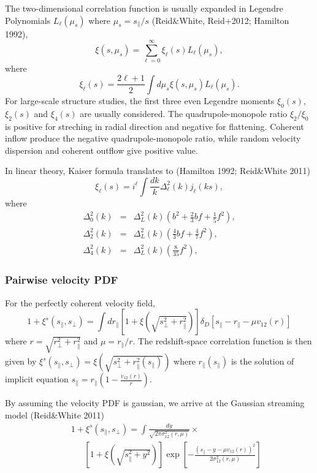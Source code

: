 \documentclass[useAMS,usenatbib,twocolumn]{mn2e}
\begin{document}
The two-dimensional correlation function is usually expanded in Legendre
Polynomials $L_\ell(\mu_s)$ where $\mu_s=s_\parallel/s$ (Reid\&White, Reid+2012;
Hamilton 1992),
\begin{equation}
\xi(s,\mu_s)=\sum_{\ell=0}^\infty\xi_\ell(s)L_\ell(\mu_s),
\end{equation}
where
\begin{equation}
\xi_\ell(s)=\frac{2\ell+1}{2}\int d\mu_s \xi(s,\mu_s)L_\ell(\mu_s).
\end{equation}
For large-scale structure studies, the first three even Legendre moments
$\xi_0(s)$, $\xi_2(s)$ and $\xi_4(s)$ are usually considered. 
The quadrupole-monopole ratio $\xi_2/\xi_0$ is positive for streching
in radial direction and negative for flattening. Coherent inflow produce
the negative quadrupole-monopole ratio, while random velocity dispersion
and coherent outflow give positive value.


In linear theory, Kaiser formula translates to (Hamilton 1992; Reid\&White 2011)
\begin{equation}
\xi_\ell(s)=i^\ell\int\frac{dk}{k}\Delta^2_\ell(k)j_\ell(ks),
\end{equation}
where 
\begin{eqnarray}
\Delta^2_0(k)&=&\Delta^2_{L}(k)(b^2+\frac{2}{3}bf+\frac{1}{5}f^2), \\
\Delta^2_2(k)&=&\Delta^2_{L}(k)(\frac{4}{3}bf+\frac{4}{7}f^2), \\
\Delta^2_4(k)&=&\Delta^2_{L}(k)(\frac{8}{35}f^2),
\end{eqnarray}


\subsubsection{Pairwise velocity PDF}
For the perfectly coherent velocity field, 
\begin{equation}
1+\xi^s(s_\parallel,s_\perp)=\int dr_\parallel
\left[1+\xi(\sqrt{s^2_\perp+r_\parallel^2})\right]
\delta_D\left[s_\parallel-r_\parallel-\mu v_{12}(r)\right]
\end{equation}
where $r=\sqrt{r_\perp^2+r_\parallel^2}$ and $\mu=r_\parallel/r$. 
The redshift-space correlation function is then given by
$\xi^s(s_\parallel,s_\perp)=\xi(\sqrt{s^2_\perp+r_\parallel^2(s_\parallel)})$
where $r_\parallel(s_\parallel)$ is the solution of implicit equation
$s_\parallel=r_\parallel\left(1-\frac{v_{12}(r)}
{r}\right)$.

By assuming the velocity PDF is gaussian,
we arrive at the Gaussian streaming model (Reid\&White 2011)
\begin{eqnarray}
&&1+\xi^s(s_\parallel,s_\perp)=\int \frac{dy}{\sqrt{2\pi\sigma_{12}^2(r,\mu)}}\times
 \\
&&~~~~~~~\left[1+\xi(\sqrt{s^2_\parallel+y^2})\right]
\exp\left[-\frac{(s_\parallel-y-\mu v_{12}(r))^2}{2\sigma^2_{12}(r,\mu)}\right]
\nonumber
\end{eqnarray}
\end{document}
